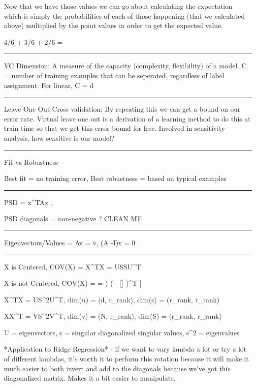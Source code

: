 \documentclass[a4paper,twoside,twocolumn]{article}
\begin{document}
{Now that we have those values we can go about calculating the expectation which is simply the probabilities of each of those happening (that we calculated above) multiplied by the point values in order to get the expected value.

4/6 + 3/6 + 2/6 = 

\noindent\rule{8cm}{0.4pt}

VC Dimension: A measure of the capacity (complexity, flexibility) of a model. C = number of training examples that can be seperated, regardless of label assignment. For linear, C = d

\noindent\rule{8cm}{0.4pt}

Leave One Out Cross validation: By repeating this we can get a bound on our error rate. Virtual leave one out is a derivation of a learning method to do this at train time so that we get this error bound for free. Involved in sensitivity analysis, how sensitive is our model?


\noindent\rule{8cm}{0.4pt}

Fit vs Robustness

Best fit = no training error, Best robustness = based on typical examples

\noindent\rule{8cm}{0.4pt}

PSD = x^TAx , 

PSD diagonals = non-negative ? CLEAN ME

\noindent\rule{8cm}{0.4pt}

Eigenvectors/Values = Av = \lambda v, (A -\lambda I)v = 0

\noindent\rule{8cm}{0.4pt}

X is Centered, COV(X) = X^TX = USSU^T

X is not Centered, COV(X) = \Sigma=
\left[
 \left(
 \mathbf{X} - \mathrm{E}[\mathbf{X}]
 \right)
 \left(
  - []
 \right)^{\rm T}
\right]

X^TX = US^2U^T, dim(u) = (d, r_rank), dim(s) = (r_rank, r_rank)

XX^T = VS^2V^T, dim(v) = (N, r_rank), dim(S) = (r_rank, r_rank)

U = eigenvectors, s = singular diagonalized singular values, s^2 = eigenvalues

*Application to Ridge Regression* - if we want to vary lambda a lot or try a lot of different lambdas, it's worth it to perform this rotation because it will make it much easier to both invert and add to the diagonals because we've got this diagonalized matrix. Makes it a bit easier to manipulate.

}
\end{document}
